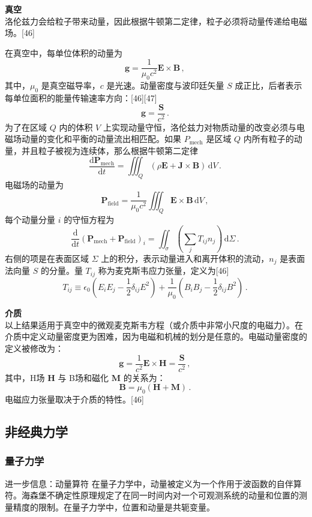 \textbf{真空}\\
洛伦兹力会给粒子带来动量，因此根据牛顿第二定律，粒子必须将动量传递给电磁场。[46]

在真空中，每单位体积的动量为
\[
\mathbf{g} = \frac{1}{\mu_0 c^2} \mathbf{E} \times \mathbf{B} \,,~
\]
其中，\(\mu_0\) 是真空磁导率，\(c\) 是光速。动量密度与波印廷矢量 \(S\) 成正比，后者表示每单位面积的能量传输速率方向：[46][47]
\[
\mathbf{g} = \frac{\mathbf{S}}{c^2} \,.~
\]
为了在区域 \(Q\) 内的体积 \(V\) 上实现动量守恒，洛伦兹力对物质动量的改变必须与电磁场动量的变化和平衡的动量流出相匹配。如果 \(P_{\text{mech}}\) 是区域 \(Q\) 内所有粒子的动量，并且粒子被视为连续体，那么根据牛顿第二定律
\[
\frac{{\text{d}} \mathbf{P}_{\text{mech}}}{{\text{d}} t} = \iiint_Q \left( \rho \mathbf{E} + \mathbf{J} \times \mathbf{B} \right) \, \text{d}V \,.~
\]
电磁场的动量为
\[
\mathbf{P}_{\text{field}} = \frac{1}{\mu_0 c^2} \iiint_Q \mathbf{E} \times \mathbf{B} \, \text{d}V \,,~
\]
每个动量分量 \(i\) 的守恒方程为
\[
\frac{{\text{d}}}{{\text{d}}t} \left( \mathbf{P}_{\text{mech}} + \mathbf{P}_{\text{field}} \right)_i = \iint_{\sigma} \left( \sum_j T_{ij} n_j \right) \, \text{d}\Sigma \,.~
\]
右侧的项是在表面区域 \(\Sigma\) 上的积分，表示动量进入和离开体积的流动，\(n_j\) 是表面法向量 \(S\) 的分量。量 \(T_{ij}\) 称为麦克斯韦应力张量，定义为[46]
\[
T_{ij} \equiv \epsilon_0 \left( E_i E_j - \frac{1}{2} \delta_{ij} E^2 \right) + \frac{1}{\mu_0} \left( B_i B_j - \frac{1}{2} \delta_{ij} B^2 \right) \,.~
\]

\textbf{介质}\\
以上结果适用于真空中的微观麦克斯韦方程（或介质中非常小尺度的电磁力）。在介质中定义动量密度更为困难，因为电磁和机械的划分是任意的。电磁动量密度的定义被修改为：
\[
\mathbf{g} = \frac{1}{c^2} \mathbf{E} \times \mathbf{H} = \frac{\mathbf{S}}{c^2} \,,~
\]
其中，H场 \( \mathbf{H} \) 与 B场和磁化 \( \mathbf{M} \) 的关系为：
\[
\mathbf{B} = \mu_0 \left( \mathbf{H} + \mathbf{M} \right) \,.~
\]
电磁应力张量取决于介质的特性。[46]
\subsection{非经典力学}
\subsubsection{量子力学} 
进一步信息：动量算符  
在量子力学中，动量被定义为一个作用于波函数的自伴算符。海森堡不确定性原理规定了在同一时间内对一个可观测系统的动量和位置的测量精度的限制。在量子力学中，位置和动量是共轭变量。

